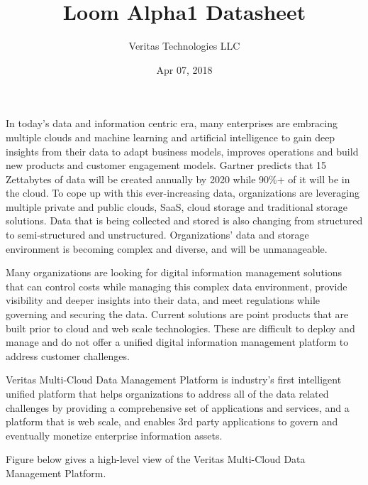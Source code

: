 \documentclass[letterpaper,10pt,english]{sphinxhowto}
\title{Loom Alpha1 Datasheet}
\date{Apr 07, 2018}
\author{Veritas Technologies LLC}
\begin{document}
\maketitle
\sphinxtableofcontents
{}\label{\detokenize{col/ds/mcdmp_ds_alpha1::doc}}



In today’s data and information centric era, many enterprises are embracing multiple clouds and machine learning and artificial intelligence to gain deep insights from their data to adapt business models, improves operations and build new products and customer engagement models. Gartner predicts that 15 Zettabytes of data will be created annually by 2020 while 90\%+ of it will be in the cloud.  To cope up with this ever-increasing data, organizations are leveraging multiple private and public clouds, SaaS, cloud storage and traditional storage solutions. Data that is being collected and stored is also changing from structured to semi-structured and unstructured. Organizations’ data and storage environment is becoming complex and diverse, and will be unmanageable.

Many organizations are looking for digital information management solutions that can control costs while managing this complex data environment, provide visibility and deeper insights into their data, and meet regulations while governing and securing the data. Current solutions are point products that are built prior to cloud and web scale technologies. These are difficult to deploy and manage and do not offer a unified digital information management platform to address customer challenges.

Veritas Multi-Cloud Data Management Platform is industry’s first intelligent unified platform that helps organizations to address all of the data related challenges by providing a comprehensive set of applications and services, and a platform that is web scale, and enables 3rd party applications to govern and eventually monetize enterprise information assets.

Figure below gives a high-level view of the Veritas Multi-Cloud Data Management Platform.

\begin{figure}[htbp]
\centering

\noindent{}
\end{figure}
\end{document}
